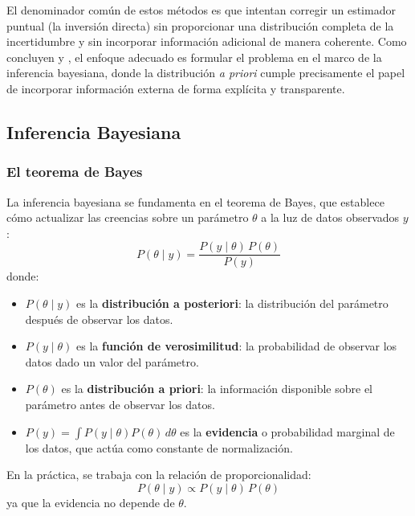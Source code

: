 \documentclass[stu, 12pt, letterpaper, donotrepeattitle, floatsintext, natbib]{apa7_ula}
\begin{document}
El denominador común de estos métodos es que intentan corregir un
estimador puntual (la inversión directa) sin proporcionar una
distribución completa de la incertidumbre y sin incorporar
información adicional de manera coherente. Como concluyen
\citet{Bailer_2015} y \citet{luri2018gaia}, el enfoque adecuado
es formular el problema en el marco de la inferencia bayesiana,
donde la distribución \textit{a priori} cumple precisamente el
papel de incorporar información externa de forma explícita y
transparente.

\subsection{Inferencia Bayesiana}

\subsubsection{El teorema de Bayes}
La inferencia bayesiana se fundamenta en el teorema de Bayes, que
establece cómo actualizar las creencias sobre un parámetro $\theta$
a la luz de datos observados $y$:
\begin{equation}
    P(\theta \mid y) = \frac{P(y \mid \theta) \, P(\theta)}{P(y)}
    \label{eq:bayes}
\end{equation}
donde:
\begin{itemize}
    \item $P(\theta \mid y)$ es la \textbf{distribución a
    posteriori}: la distribución del parámetro después de observar
    los datos.
    \item $P(y \mid \theta)$ es la \textbf{función de
    verosimilitud}: la probabilidad de observar los datos dado un
    valor del parámetro.
    \item $P(\theta)$ es la \textbf{distribución a priori}: la
    información disponible sobre el parámetro antes de observar
    los datos.
    \item $P(y) = \int P(y \mid \theta) P(\theta) \, d\theta$ es
    la \textbf{evidencia} o probabilidad marginal de los datos, que
    actúa como constante de normalización.
\end{itemize}

En la práctica, se trabaja con la relación de proporcionalidad:
\begin{equation}
    P(\theta \mid y) \propto P(y \mid \theta) \, P(\theta)
    \label{eq:bayes_prop}
\end{equation}
ya que la evidencia no depende de $\theta$.
\end{document}
